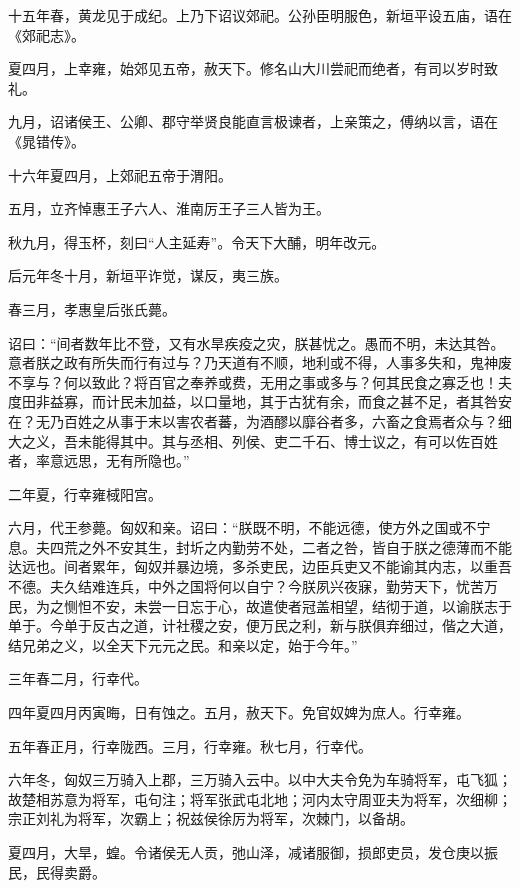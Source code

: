 \documentclass[]{article}
\begin{document}
十五年春，黄龙见于成纪。上乃下诏议郊祀。公孙臣明服色，新垣平设五庙，语在《郊祀志》。

夏四月，上幸雍，始郊见五帝，赦天下。修名山大川尝祀而绝者，有司以岁时致礼。

九月，诏诸侯王、公卿、郡守举贤良能直言极谏者，上亲策之，傅纳以言，语在《晁错传》。

十六年夏四月，上郊祀五帝于渭阳。

五月，立齐悼惠王子六人、淮南厉王子三人皆为王。

秋九月，得玉杯，刻曰``人主延寿''。令天下大酺，明年改元。

后元年冬十月，新垣平诈觉，谋反，夷三族。

春三月，孝惠皇后张氏薨。

诏曰：``间者数年比不登，又有水旱疾疫之灾，朕甚忧之。愚而不明，未达其咎。意者朕之政有所失而行有过与？乃天道有不顺，地利或不得，人事多失和，鬼神废不享与？何以致此？将百官之奉养或费，无用之事或多与？何其民食之寡乏也！夫度田非益寡，而计民未加益，以口量地，其于古犹有余，而食之甚不足，者其咎安在？无乃百姓之从事于末以害农者蕃，为酒醪以靡谷者多，六畜之食焉者众与？细大之义，吾未能得其中。其与丞相、列侯、吏二千石、博士议之，有可以佐百姓者，率意远思，无有所隐也。''

二年夏，行幸雍棫阳宫。

六月，代王参薨。匈奴和亲。诏曰：``朕既不明，不能远德，使方外之国或不宁息。夫四荒之外不安其生，封圻之内勤劳不处，二者之咎，皆自于朕之德薄而不能达远也。间者累年，匈奴并暴边境，多杀吏民，边臣兵吏又不能谕其内志，以重吾不德。夫久结难连兵，中外之国将何以自宁？今朕夙兴夜寐，勤劳天下，忧苦万民，为之恻怛不安，未尝一日忘于心，故遣使者冠盖相望，结彻于道，以谕朕志于单于。今单于反古之道，计社稷之安，便万民之利，新与朕俱弃细过，偕之大道，结兄弟之义，以全天下元元之民。和亲以定，始于今年。''

三年春二月，行幸代。

四年夏四月丙寅晦，日有蚀之。五月，赦天下。免官奴婢为庶人。行幸雍。

五年春正月，行幸陇西。三月，行幸雍。秋七月，行幸代。

六年冬，匈奴三万骑入上郡，三万骑入云中。以中大夫令免为车骑将军，屯飞狐；故楚相苏意为将军，屯句注；将军张武屯北地；河内太守周亚夫为将军，次细柳；宗正刘礼为将军，次霸上；祝兹侯徐厉为将军，次棘门，以备胡。

夏四月，大旱，蝗。令诸侯无人贡，弛山泽，减诸服御，损郎吏员，发仓庚以振民，民得卖爵。
\end{document}
